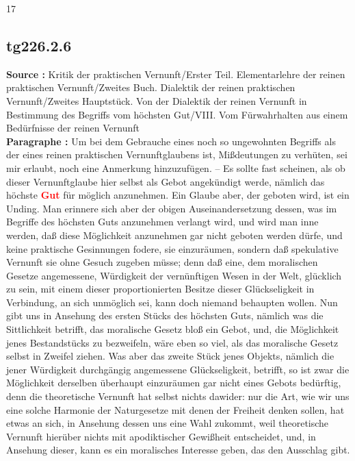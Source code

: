 \documentclass[a4paper,12pt,twoside]{book}
\newcommand{\match}[1]{\textcolor{red}{\textbf{#1}}}
\begin{document}
	
	17
	
	
	
	\subsection*{tg226.2.6} 
	\textbf{Source : }Kritik der praktischen Vernunft/Erster Teil. Elementarlehre der reinen praktischen Vernunft/Zweites Buch. Dialektik der reinen praktischen Vernunft/Zweites Hauptstück. Von der Dialektik der reinen Vernunft in Bestimmung des Begriffs vom höchsten Gut/VIII. Vom Fürwahrhalten aus einem Bedürfnisse der reinen Vernunft\\  
	
	\textbf{Paragraphe : }Um bei dem Gebrauche eines noch so ungewohnten Begriffs als der eines reinen praktischen Vernunftglaubens ist, Mißdeutungen zu verhüten, sei mir erlaubt, noch eine Anmerkung hinzuzufügen. – Es sollte fast scheinen, als ob dieser Vernunftglaube hier selbst als Gebot angekündigt werde, nämlich das höchste \match{Gut} für möglich anzunehmen. Ein Glaube aber, der geboten wird, ist ein Unding. Man erinnere sich aber der obigen Auseinandersetzung dessen, was im Begriffe des höchsten Guts anzunehmen verlangt wird, und wird man inne werden, daß diese Möglichkeit anzunehmen gar nicht geboten werden dürfe, und keine praktische Gesinnungen fodere, sie einzuräumen, sondern daß spekulative Vernunft sie ohne Gesuch zugeben müsse; denn daß eine, dem moralischen Gesetze angemessene, Würdigkeit der vernünftigen Wesen in der Welt, glücklich zu sein, mit einem dieser proportionierten Besitze dieser Glückseligkeit in Verbindung, an sich unmöglich sei, kann doch niemand behaupten wollen. Nun gibt uns in Ansehung des ersten Stücks des höchsten Guts, nämlich was die Sittlichkeit betrifft, das moralische Gesetz bloß ein Gebot, und, die Möglichkeit jenes Bestandstücks zu bezweifeln, wäre eben so viel, als das moralische Gesetz selbst in Zweifel ziehen. Was aber das zweite Stück jenes Objekts, nämlich die jener Würdigkeit durchgängig angemessene Glückseligkeit, betrifft, so ist zwar die Möglichkeit derselben überhaupt einzuräumen gar nicht eines Gebots bedürftig, denn die theoretische Vernunft hat selbst nichts dawider: nur die Art, wie wir uns eine solche Harmonie der Naturgesetze mit denen der Freiheit denken sollen, hat etwas an sich, in Ansehung dessen uns eine Wahl zukommt, weil theoretische Vernunft hierüber nichts mit apodiktischer Gewißheit entscheidet, und, in Ansehung dieser, kann es ein moralisches Interesse geben, das den Ausschlag gibt. 
	
\end{document}
